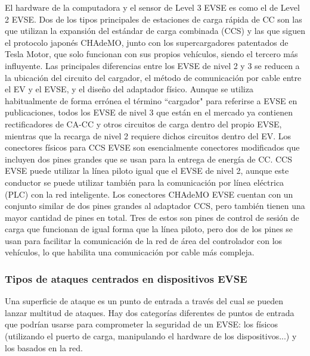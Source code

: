 \documentclass[12pt,a4paper,onecolumn,oneside]{report}
\newcounter{subsubsubsection}[subsubsection]
\begin{document}
El hardware de la computadora y el sensor de Level 3 EVSE es como el de Level 2 EVSE. Dos de los tipos principales de estaciones de carga rápida de CC son las que utilizan la expansión del estándar de carga combinada (CCS) y las que siguen el protocolo japonés CHAdeMO, junto con los supercargadores patentados de Tesla Motor, que solo funcionan con sus propios vehículos, siendo el tercero más influyente. Las principales diferencias entre los EVSE de nivel 2 y 3 se reducen a la ubicación del circuito del cargador, el método de comunicación por cable entre el EV y el EVSE, y el diseño del adaptador físico. Aunque se utiliza habitualmente de forma errónea el término ``cargador" para referirse a EVSE en publicaciones, todos los EVSE de nivel 3 que están en el mercado ya contienen rectificadores de CA-CC y otros circuitos de carga dentro del propio EVSE, mientras que la recarga de nivel 2 requiere dichos circuitos dentro del EV. Los conectores físicos para CCS EVSE son esencialmente conectores modificados que incluyen dos pines grandes que se usan para la entrega de energía de CC. CCS EVSE puede utilizar la línea piloto igual que el EVSE de nivel 2, aunque este conductor se puede utilizar también para la comunicación por línea eléctrica (PLC) con la red inteligente. Los conectores CHAdeMO EVSE cuentan con un conjunto similar de dos pines grandes al adaptador CCS, pero también tienen una mayor cantidad de pines en total. Tres de estos son pines de control de sesión de carga que funcionan de igual forma que la línea piloto, pero dos de los pines se usan para facilitar la comunicación de la red de área del controlador con los vehículos, lo que habilita una comunicación por cable más compleja.

\subsubsection{Tipos de ataques centrados en dispositivos EVSE}
\label{Tipos de ataques centrados en dispositivos EVSE}

Una superficie de ataque es un punto de entrada a través del cual se pueden lanzar multitud de ataques. Hay dos categorías diferentes de puntos de entrada que podrían usarse para comprometer la seguridad de un EVSE: los físicos (utilizando el puerto de carga, manipulando el hardware de los dispositivos...) y los basados en la red.


\end{document}
